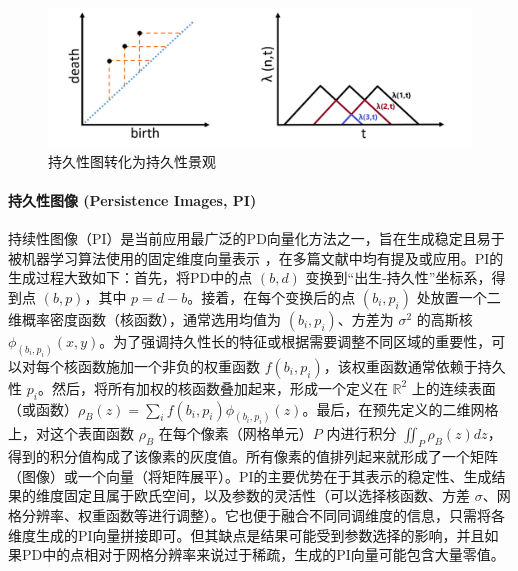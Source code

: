 \begin{figure}[thbp!]
    \centering
    \includegraphics[width=1.0\textwidth]{figure/持久性景观.png}
    \caption{持久性图转化为持久性景观}
\end{figure}


\paragraph{持久性图像 (Persistence Images, PI)}
\label{sec:feat_pi}
持续性图像（PI）\cite{pun2022persistent}是当前应用最广泛的PD向量化方法之一，旨在生成稳定且易于被机器学习算法使用的固定维度向量表示 ，在多篇文献中均有提及或应用。PI的生成过程大致如下：首先，将PD中的点 $(b, d)$ 变换到“出生-持久性”坐标系，得到点 $(b, p)$，其中 $p = d-b$。接着，在每个变换后的点 $(b_i, p_i)$ 处放置一个二维概率密度函数（核函数），通常选用均值为 $(b_i, p_i)$、方差为 $\sigma^2$ 的高斯核 $\phi_{(b_i, p_i)}(x, y)$。为了强调持久性长的特征或根据需要调整不同区域的重要性，可以对每个核函数施加一个非负的权重函数 $f(b_i, p_i)$，该权重函数通常依赖于持久性 $p_i$。然后，将所有加权的核函数叠加起来，形成一个定义在 $\mathbb{R}^2$ 上的连续表面（或函数）$\rho_{B}(z) = \sum_i f(b_i, p_i) \phi_{(b_i, p_i)}(z)$。最后，在预先定义的二维网格上，对这个表面函数 $\rho_B$ 在每个像素（网格单元）$P$ 内进行积分 $\iint_P \rho_B(z) dz$，得到的积分值构成了该像素的灰度值。所有像素的值排列起来就形成了一个矩阵（图像）或一个向量（将矩阵展平）。PI的主要优势在于其表示的稳定性、生成结果的维度固定且属于欧氏空间，以及参数的灵活性（可以选择核函数、方差 $\sigma$、网格分辨率、权重函数等进行调整）。它也便于融合不同同调维度的信息，只需将各维度生成的PI向量拼接即可。但其缺点是结果可能受到参数选择的影响，并且如果PD中的点相对于网格分辨率来说过于稀疏，生成的PI向量可能包含大量零值。

